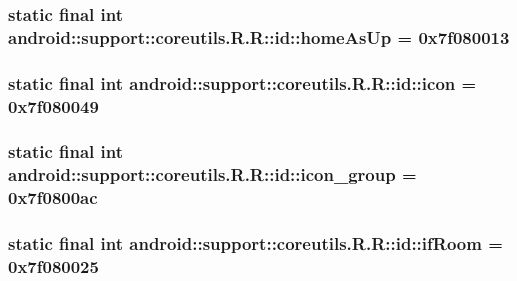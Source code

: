 \hypertarget{classandroid_1_1support_1_1coreutils_1_1_r_1_1id_7435d0cc17a8a5f35aa048e83906c80e}{
\subsubsection[{homeAsUp}]{\setlength{\rightskip}{0pt plus 5cm}static final int android::support::coreutils.R.R::id::homeAsUp = 0x7f080013}}
\label{classandroid_1_1support_1_1coreutils_1_1_r_1_1id_7435d0cc17a8a5f35aa048e83906c80e}


\hypertarget{classandroid_1_1support_1_1coreutils_1_1_r_1_1id_7a6c45b0f4909dbf198c8b716c417c6e}{
\subsubsection[{icon}]{\setlength{\rightskip}{0pt plus 5cm}static final int android::support::coreutils.R.R::id::icon = 0x7f080049}}
\label{classandroid_1_1support_1_1coreutils_1_1_r_1_1id_7a6c45b0f4909dbf198c8b716c417c6e}


\hypertarget{classandroid_1_1support_1_1coreutils_1_1_r_1_1id_dc7f3dde4fcaed4a3404277fb4443217}{
\subsubsection[{icon\_\-group}]{\setlength{\rightskip}{0pt plus 5cm}static final int android::support::coreutils.R.R::id::icon\_\-group = 0x7f0800ac}}
\label{classandroid_1_1support_1_1coreutils_1_1_r_1_1id_dc7f3dde4fcaed4a3404277fb4443217}


\hypertarget{classandroid_1_1support_1_1coreutils_1_1_r_1_1id_68edb0a08f3b1621e796c9b01d1effaa}{
\subsubsection[{ifRoom}]{\setlength{\rightskip}{0pt plus 5cm}static final int android::support::coreutils.R.R::id::ifRoom = 0x7f080025}}
\label{classandroid_1_1support_1_1coreutils_1_1_r_1_1id_68edb0a08f3b1621e796c9b01d1effaa}


